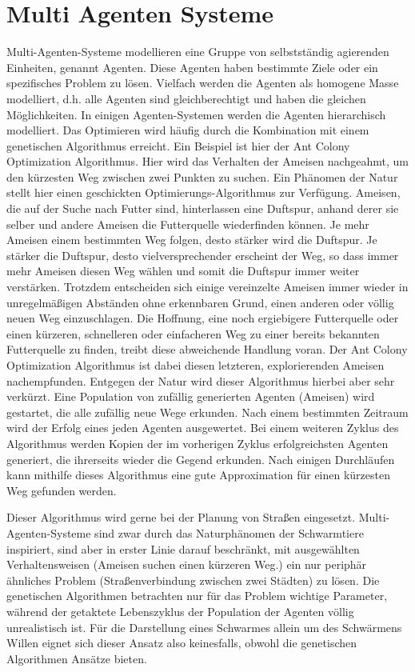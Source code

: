 \documentclass[draft=false
              ,paper=a4
              ,twoside=false
              ,fontsize=11pt
              ,headsepline
              ,BCOR10mm
              ,DIV11
              ,bibtotoc
              ,liststotoc
              ]{scrbook}
\begin{document}
\section{Multi Agenten Systeme}
Multi-Agenten-Systeme modellieren eine Gruppe von selbstständig agierenden Einheiten, genannt Agenten. Diese Agenten haben bestimmte Ziele oder ein spezifisches Problem zu lösen. Vielfach werden die Agenten als homogene Masse modelliert, d.h. alle Agenten sind gleichberechtigt und haben die gleichen Möglichkeiten. In einigen Agenten-Systemen werden die Agenten hierarchisch modelliert. Das Optimieren wird häufig durch die Kombination mit einem genetischen Algorithmus erreicht.
Ein Beispiel ist hier der Ant Colony Optimization Algorithmus. Hier wird das Verhalten der Ameisen nachgeahmt, um den kürzesten Weg zwischen zwei Punkten zu suchen. Ein Phänomen der Natur stellt hier einen geschickten Optimierungs-Algorithmus zur Verfügung. Ameisen, die auf der Suche nach Futter sind, hinterlassen eine Duftspur, anhand derer sie selber und andere Ameisen die Futterquelle wiederfinden können. Je mehr Ameisen einem bestimmten Weg folgen, desto stärker wird die Duftspur. Je stärker die Duftspur, desto vielversprechender erscheint der Weg, so dass immer mehr Ameisen diesen Weg wählen und somit die Duftspur immer weiter verstärken. Trotzdem entscheiden sich einige vereinzelte Ameisen immer wieder in unregelmäßigen Abständen ohne erkennbaren Grund, einen anderen oder völlig neuen Weg einzuschlagen. Die Hoffnung, eine noch ergiebigere Futterquelle oder einen kürzeren, schnelleren oder einfacheren Weg zu einer bereits bekannten Futterquelle zu finden, treibt diese abweichende Handlung voran. Der Ant Colony Optimization Algorithmus ist dabei diesen letzteren, explorierenden Ameisen nachempfunden. Entgegen der Natur wird dieser Algorithmus hierbei aber sehr verkürzt. Eine Population von zufällig generierten Agenten (Ameisen) wird gestartet, die alle zufällig neue Wege erkunden. Nach einem bestimmten Zeitraum wird der Erfolg eines jeden Agenten ausgewertet. Bei einem weiteren Zyklus des Algorithmus werden Kopien der im vorherigen Zyklus erfolgreichsten Agenten generiert, die ihrerseits wieder die Gegend erkunden. Nach einigen Durchläufen kann mithilfe dieses Algorithmus eine gute Approximation für einen kürzesten Weg gefunden werden.

Dieser Algorithmus wird gerne bei der Planung von Straßen eingesetzt. Multi-Agenten-Systeme sind zwar durch das Naturphänomen der Schwarmtiere inspiriert, sind aber in erster Linie darauf beschränkt, mit ausgewählten Verhaltensweisen (Ameisen suchen einen kürzeren Weg.) ein nur periphär ähnliches Problem (Straßenverbindung zwischen zwei Städten) zu lösen. Die genetischen Algorithmen betrachten nur für das Problem wichtige Parameter, während der getaktete Lebenszyklus der Population der Agenten völlig unrealistisch ist. Für die Darstellung eines Schwarmes allein um des Schwärmens Willen eignet sich dieser Ansatz also keinesfalls, obwohl die genetischen Algorithmen Ansätze bieten.
\end{document}
